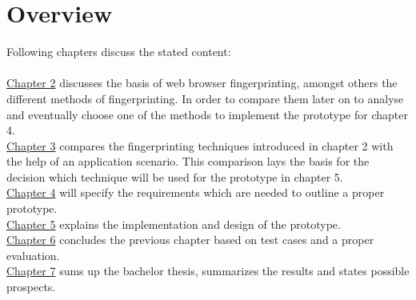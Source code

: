 \section{Overview}
Following chapters discuss the stated content:\\\\
\hyperref[cha:foundation]{Chapter 2} discusses the basis of web browser fingerprinting, amongst others the different methods of fingerprinting. In order to compare them later on to analyse and eventually choose one of the methods to implement the prototype for chapter 4.\\
\hyperref[cha:ApplicationScenario]{Chapter 3} compares the fingerprinting techniques introduced in chapter 2 with the help of an application scenario. This comparison lays the basis for the decision which technique will be used for the prototype in chapter 5.\\
\hyperref[cha:requirements]{Chapter 4} will specify the requirements which are needed to outline a proper prototype.\\
\hyperref[cha:implementation]{Chapter 5} explains the implementation and design of the prototype.\\
\hyperref[cha:evaluation]{Chapter 6} concludes the previous chapter based on test cases and a proper evaluation.\\
\hyperref[cha:summary]{Chapter 7} sums up the bachelor thesis, summarizes the results and states possible prospects.




